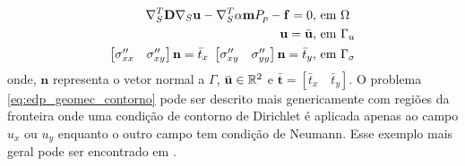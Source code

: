 \begin{equation} \label{eq:edp_geomec_contorno}
\begin{aligned}
     \nabla_S^T \mathbf{D} \nabla_S \mathbf{u} - \nabla_S^T\alpha \mathbf{m} P_p - \mathbf{f} = 0, & \text{ em }\Omega  \\
     \mathbf{u} = \bar{\mathbf{u}},& \text{ em } \Gamma_u \\
    \begin{bmatrix}
        \sigma_{xx}^{\prime\prime} & \sigma_{xy}^{\prime\prime}
    \end{bmatrix} \mathbf{n} = \bar{t}_x \text{   }     \begin{bmatrix}
        \sigma_{xy}^{\prime\prime} & \sigma_{yy}^{\prime\prime}
    \end{bmatrix} \mathbf{n} = \bar{t}_y, & \text{   em } \Gamma_{\sigma} 
\end{aligned}  
\end{equation}
onde, $\mathbf{n}$ representa o vetor normal a $\Gamma$, $\bar{\mathbf{u}} \in \mathbb{R}^2$ e $\bar{\mathbf{t}} = [ \bar{t}_x \quad \bar{t}_y ]$. O problema \eqref{eq:edp_geomec_contorno} pode ser descrito mais genericamente com regiões da fronteira onde uma condição de contorno de Dirichlet é aplicada apenas ao campo $u_x$ ou $u_y$ enquanto o outro campo tem condição de Neumann. Esse exemplo mais geral pode ser encontrado em \citet{hughes}.
